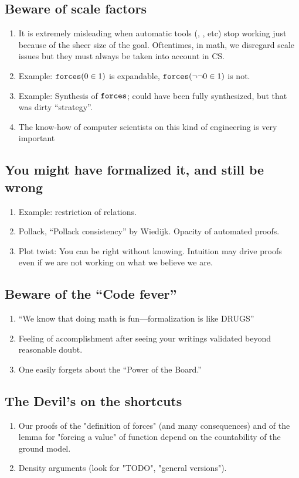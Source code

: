 \subsection{Beware of scale factors}
\begin{enumerate}
\item It is extremely misleading when automatic tools (, , etc)
  stop working just because of the sheer size of the goal. Oftentimes,
  in math, we disregard scale issues but they must always be taken
  into account in CS.
\item Example: $\mathop{\mathtt{forces}}(0\in 1)$ is expandable,
  $\mathop{\mathtt{forces}}(\neg\neg  0\in 1)$ is not.
\item Example: Synthesis of $\mathop{\mathtt{forces}}$; could have been fully synthesized,
  but that was dirty “strategy”.
\item The know-how of computer scientists on this kind of engineering is
  very important
\end{enumerate}

\subsection{You might have formalized it, and still be wrong}
\begin{enumerate}
\item Example: restriction of relations.
\item Pollack, “Pollack consistency” by Wiedijk. Opacity of automated
  proofs.
\item Plot twist: You can be right without knowing. Intuition may drive proofs
  even if we are not working on what we believe we are.
\end{enumerate}

\subsection{Beware of the “Code fever”}\label{sec:beware-code-fever}
\begin{enumerate}
\item “We know that doing math is fun---formalization is like DRUGS”
\item Feeling of accomplishment after seeing your writings
  validated beyond reasonable doubt.
\item One easily forgets about the “Power of the Board.”
\end{enumerate}

\subsection{The Devil's on the shortcuts}
\begin{enumerate}
\item
  Our proofs of the "definition of forces" (and many
  consequences) and of the lemma for "forcing a value" of function
  depend on the countability of the ground model. 
\item
  Density arguments (look for "TODO", "general versions").
\end{enumerate}

